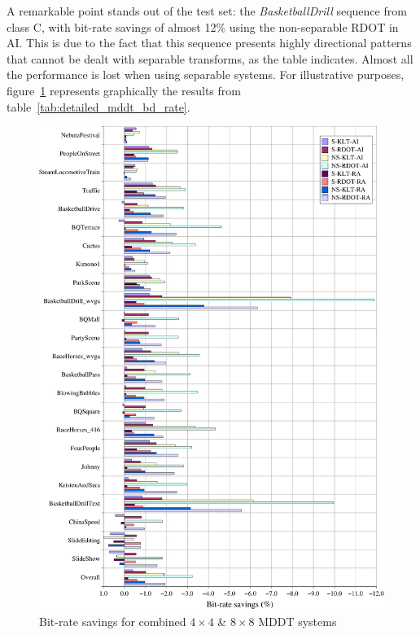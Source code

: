 \documentclass[11pt,a4paper,openright,twoside]{book}
\numberwithin{equation}{section} %
\numberwithin{figure}{section} %
\numberwithin{table}{section} %
\begin{document}
A remarkable point stands out of the test set: the \emph{BasketballDrill}
sequence from class C, with bit-rate savings of almost 12\% using the
non-separable \ac{RDOT} in \ac{AI}.
This is due to the fact that this sequence presents highly directional
patterns that cannot be dealt with separable transforms, as the table
indicates.
Almost all the performance is lost when using separable systems.
For illustrative purposes, figure~\ref{fig:detailed_mddt_bd_rate} represents
graphically the results from table~\ref{tab:detailed_mddt_bd_rate}.

\begin{figure}[tp]
	\centering
	\includegraphics[width=1\linewidth]{./figures/detailed_mddt_4_8.pdf}
	\caption{Bit-rate savings for combined $4\times4$ \& $8\times8$ \acs{MDDT}
	systems}
	\label{fig:detailed_mddt_bd_rate}
\end{figure}
\end{document}
